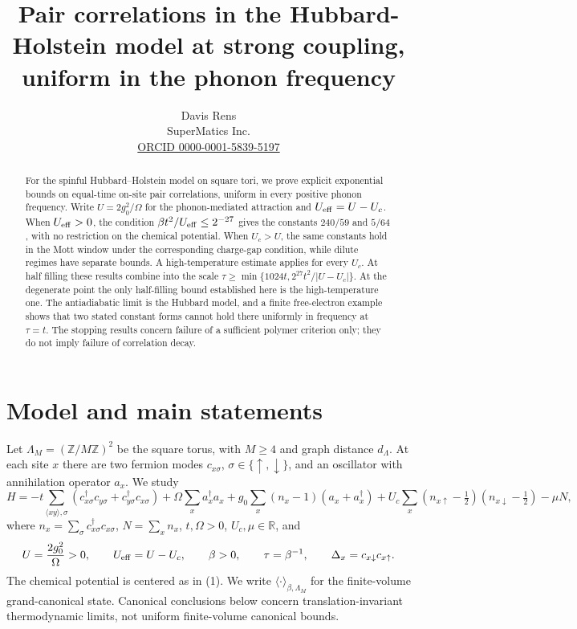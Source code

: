 \documentclass[11pt]{article}
\title{Pair correlations in the Hubbard-Holstein model at strong coupling, uniform in the phonon frequency}
\author{Davis Rens\\SuperMatics Inc.\\\href{https://orcid.org/0000-0001-5839-5197}{ORCID 0000-0001-5839-5197}}
\date{\smash{\parbox{.98\linewidth}{\centering\scriptsize
\ifstaged{\HUBHOLDOI}{Article DOI: \expandafter\DOI\expandafter{\HUBHOLDOI}\quad}{}
\ifstaged{\HUBHOLSUPPDOI}{Supplement DOI: \expandafter\DOI\expandafter{\HUBHOLSUPPDOI}}{}\\
\ifstaged{\HUBHOLREPO}{Source repository: \expandafter\url\expandafter{\HUBHOLREPO}}{}
}}}
\newcommand{\Deltaop}{\Delta}
\begin{document}
\maketitle

\begin{abstract}
For the spinful Hubbard–Holstein model on square tori, we prove explicit exponential bounds on equal-time on-site pair correlations, uniform in every positive phonon frequency. Write $U=2g_0^2/\Omega$ for the phonon-mediated attraction and $U_{\rm eff}=U-U_c$. When $U_{\rm eff}>0$, the condition $\beta t^2/U_{\rm eff}\le 2^{-27}$ gives the constants $240/59$ and $5/64$, with no restriction on the chemical potential. When $U_c>U$, the same constants hold in the Mott window under the corresponding charge-gap condition, while dilute regimes have separate bounds. A high-temperature estimate applies for every $U_c$. At half filling these results combine into the scale $\tau\ge\min\{1024t,2^{27}t^2/|U-U_c|\}$. At the degenerate point the only half-filling bound established here is the high-temperature one. The antiadiabatic limit is the Hubbard model, and a finite free-electron example shows that two stated constant forms cannot hold there uniformly in frequency at $\tau=t$. The stopping results concern failure of a sufficient polymer criterion only; they do not imply failure of correlation decay.
\end{abstract}

\section{Model and main statements}

Let $\Lambda_M=(\mathbb Z/M\mathbb Z)^2$ be the square torus, with $M\ge4$ and graph distance $d_\Lambda$. At each site $x$ there are two fermion modes $c_{x\sigma}$, $\sigma\in\{\uparrow,\downarrow\}$, and an oscillator with annihilation operator $a_x$. We study
\begin{equation}\label{eq:hamiltonian}
 H=-t\sum_{\langle xy\rangle,\sigma}
 (c_{x\sigma}^\dagger c_{y\sigma}+c_{y\sigma}^\dagger c_{x\sigma})
 +\Omega\sum_x a_x^\dagger a_x
 +g_0\sum_x(n_x-1)(a_x+a_x^\dagger)
 +U_c\sum_x\left(n_{x\uparrow}-\tfrac12\right)
                  \left(n_{x\downarrow}-\tfrac12\right)-\mu N,
\end{equation}
where $n_x=\sum_\sigma c_{x\sigma}^\dagger c_{x\sigma}$, $N=\sum_x n_x$, $t,\Omega>0$, $U_c,\mu\in\mathbb R$, and
\[
 U=\frac{2g_0^2}{\Omega}>0,\qquad
 U_{\rm eff}=U-U_c,\qquad
 \beta>0,\qquad \tau=\beta^{-1},\qquad
 \Deltaop_x=c_{x\downarrow}c_{x\uparrow}.
\]
The chemical potential is centered as in (1). We write $\langle\cdot\rangle_{\beta,\Lambda_M}$ for the finite-volume grand-canonical state. Canonical conclusions below concern translation-invariant thermodynamic limits, not uniform finite-volume canonical bounds.
\end{document}
